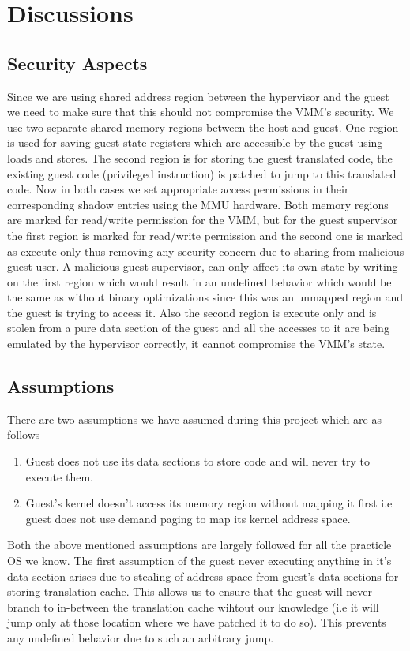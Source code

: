 \chapter{Discussions}\label{ch:7}

\section{Security Aspects}
Since we are using shared address region between the hypervisor and the guest we need to make sure that this should not compromise the VMM's security. We use two separate shared memory regions between the host and guest. One region is used for saving guest state registers which are accessible by the guest using loads and stores. The second region is for storing the guest translated code, the existing guest code (privileged instruction) is patched to jump to this translated code. Now in both cases we set appropriate access permissions in their corresponding shadow entries using the MMU hardware. Both memory regions are marked for read/write permission for the VMM, but for the guest supervisor the first region is marked for read/write permission and the second one is marked as execute only thus removing any security concern due to sharing from malicious guest user. A malicious guest supervisor, can only affect its own state by writing on the first region which would result in an undefined behavior which would be the same as without binary optimizations since this was an unmapped region and the guest is trying to access it. Also the second region is execute only and is stolen from a pure data section of the guest and all the accesses to it are being emulated by the hypervisor correctly, it cannot compromise the VMM’s state.

\section{Assumptions}
There are two assumptions we have assumed during this project which are as follows
\begin{enumerate}
\item Guest does not use its data sections to store code and will never try to execute them.
\item Guest's kernel doesn't access its memory region without mapping it first i.e guest does not use demand paging to map its kernel address space.
\end{enumerate} 

Both the above mentioned assumptions are largely followed for all the practicle OS we know. The first assumption of the guest never executing anything in it's data section arises due to stealing of address space from guest's data sections for storing translation cache.
This allows us to ensure that the guest will never branch to in-between the translation cache wihtout our knowledge (i.e it will jump only at those location where we have patched it to do so). This prevents any undefined behavior due to such an arbitrary jump.

